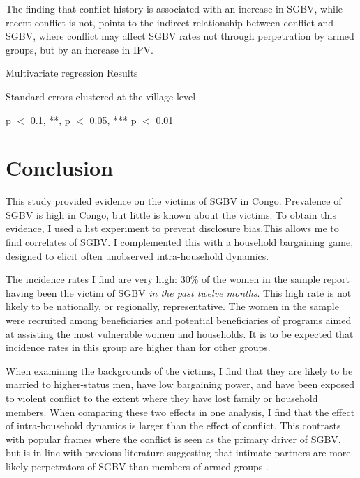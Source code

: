 \documentclass[10pt,a4paper,abstract=on]{scrartcl} %
\begin{document}
The finding that conflict history is associated with an increase in SGBV, while recent conflict is not, points to the indirect relationship between conflict and SGBV, where conflict may affect SGBV rates not through perpetration by armed groups, but by an increase in IPV.

\begin{threeparttable}
	\caption{Multivariate regression Results}\label{tab:results_regression}
	\begin{center}
	
	
	\begin{tablenotes}
	\small
	 \item Standard errors clustered at the village level
	 \item * p $<$ 0.1, **, p $<$ 0.05, *** p $<$ 0.01
	\end{tablenotes}
	\end{center}
\end{threeparttable}

\section*{Conclusion}
This study provided evidence on the victims of SGBV in Congo. Prevalence of SGBV is high in Congo, but little is known about the victims. To obtain this evidence, I used a list experiment to prevent disclosure bias.This allows me to find correlates of SGBV. I complemented this with a household bargaining game, designed to elicit often unobserved intra-household dynamics.

The incidence rates I find are very high: 30\% of the women in the sample report having been the victim of SGBV \textit{in the past twelve months}. This high rate is not likely to be nationally, or regionally, representative. The women in the sample were recruited among beneficiaries and potential beneficiaries of programs aimed at assisting the most vulnerable women and households. It is to be expected that incidence rates in this group are higher than for other groups.

When examining the backgrounds of the victims, I find that they are likely to be married to higher-status men, have low bargaining power, and have been exposed to violent conflict to the extent where they have lost family or household members. When comparing these two effects in one analysis, I find that the effect of intra-household dynamics is larger than the effect of conflict. This contrasts with popular frames where the conflict is seen as the primary driver of SGBV, but is in line with previous literature suggesting that intimate partners are more likely perpetrators of SGBV than members of armed groups \citep[see e.g.][]{Peterman2011}. 
\end{document}
